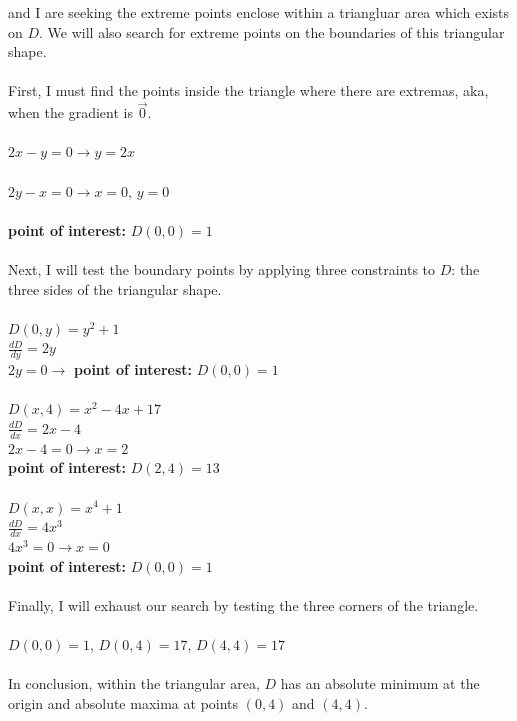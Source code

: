 \documentclass[12pt]{article}
\begin{document}
\noindent and I are seeking the extreme points enclose within a triangluar area which exists on $D$. We will also search 
for extreme points on the boundaries of this triangular shape. \\\\
\noindent First, I must find the points inside the triangle where there are extremas, aka, when the gradient is $\vec{0}$.\\\\
\noindent $2x - y = 0 \rightarrow y = 2x$\\\\
\noindent $2y - x = 0 \rightarrow x = 0\text{, } y = 0$\\\\
\noindent \textbf{point of interest: }$D(0,0) = 1$\\\\
\noindent Next, I will test the boundary points by applying three constraints to $D$: the three sides of the triangular shape.\\\\
\noindent $D(0, y) = y^{2} + 1$\\
\noindent $\frac{dD}{dy} = 2y$\\
\noindent $2y = 0 \rightarrow$ \textbf{point of interest: } $D(0, 0) = 1$\\\\
\noindent $D(x, 4) = x^{2}-4x+17$\\
\noindent $\frac{dD}{dx} =2x -4$\\
\noindent $2x -4 = 0 \rightarrow x = 2$\\
\noindent \textbf{point of interest: } $D(2, 4) = 13$\\\\
\noindent $D(x, x) = x^{4}+1$\\
\noindent $\frac{dD}{dx} =4x^{3}$\\
\noindent $4x^{3} = 0 \rightarrow x = 0$\\
\noindent \textbf{point of interest: } $D(0, 0) = 1$\\\\
\noindent Finally, I will exhaust our search by testing the three corners of the triangle.\\\\
\noindent $D(0,0) = 1$, \hspace{10pt} $D(0,4) = 17$, \hspace{10pt} $D(4, 4) = 17$\\\\
\noindent In conclusion, within the triangular area, $D$ has an absolute minimum at the origin and absolute maxima at points $(0,4)$ and $(4,4)$.\\\\\\
\end{document}
